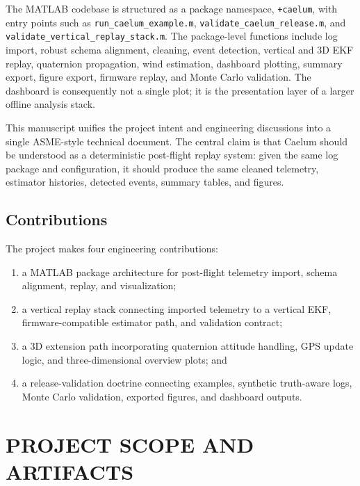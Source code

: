 \documentclass[colorlinks,upint,subscriptcorrection,varvw,hyphenate,balance]{asmeconf}
\newcommand{\code}[1]{\texttt{\allowbreak#1}}
\newcommand{\pkg}{\code{+caelum}}
\begin{document}
The MATLAB codebase is structured as a package namespace, \pkg{}, with entry points such as \code{run\_caelum\_example.m}, \code{validate\_caelum\_release.m}, and \code{validate\_vertical\_replay\_stack.m}. The package-level functions include log import, robust schema alignment, cleaning, event detection, vertical and 3D EKF replay, quaternion propagation, wind estimation, dashboard plotting, summary export, figure export, firmware replay, and Monte Carlo validation. The dashboard is consequently not a single plot; it is the presentation layer of a larger offline analysis stack.

This manuscript unifies the project intent and engineering discussions into a single ASME-style technical document. The central claim is that Caelum should be understood as a deterministic post-flight replay system: given the same log package and configuration, it should produce the same cleaned telemetry, estimator histories, detected events, summary tables, and figures.

\subsection{Contributions}
The project makes four engineering contributions:
\begin{enumerate}[leftmargin=*,nosep]
\item a MATLAB package architecture for post-flight telemetry import, schema alignment, replay, and visualization;
\item a vertical replay stack connecting imported telemetry to a vertical EKF, firmware-compatible estimator path, and validation contract;
\item a 3D extension path incorporating quaternion attitude handling, GPS update logic, and three-dimensional overview plots; and
\item a release-validation doctrine connecting examples, synthetic truth-aware logs, Monte Carlo validation, exported figures, and dashboard outputs.
\end{enumerate}

\section{PROJECT SCOPE AND ARTIFACTS}
\end{document}
